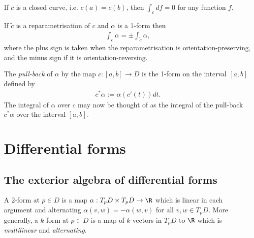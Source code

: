 \documentclass{article}
\begin{document}
\begin{corollary}
    If $c$ is a closed curve, i.e. $c(a)=c(b)$, then $\int_c df = 0$ for any function $f$.
\end{corollary}

\begin{proposition}
    If $\tilde c$ is a reparametrisation of $c$ and $\alpha$ is a 1-form then 
    \begin{align*}
        \int_c \alpha = \pm \int_{\tilde c} \alpha,
    \end{align*}
    where the plus sign is taken when the reparametrisation is orientation-preserving,
    and the minus sign if it is orientation-reversing.
\end{proposition}

\begin{definition}
    The \emph{pull-back} of $\alpha$ by the map $c:[a,b]\to D$ is the 1-form on the
    interval $[a,b]$ defined by
    \begin{align*}
        c^*\alpha :=  \alpha(c'(t))dt.
    \end{align*}
    The integral of $\alpha$ over $c$ may now be thought of as the integral of the pull-back 
    $c^*\alpha$ over the interval $[a,b]$.
\end{definition}

\section{Differential forms}

\subsection{The exterior algebra of differential forms}

\begin{definition}
    A 2-form at $p\in D$ is a map $\alpha:T_pD\times T_p D \to \R$ which is linear in each argument
    and alternating $\alpha(v,w)=-\alpha(w,v)$ for all $v,w\in T_pD$. More generally, a $k$-form at
    $p\in D$ is a map of $k$ vectors in $T_pD$ to $\R$ which is \emph{multilinear} and \emph{alternating}.
\end{definition}
\end{document}
